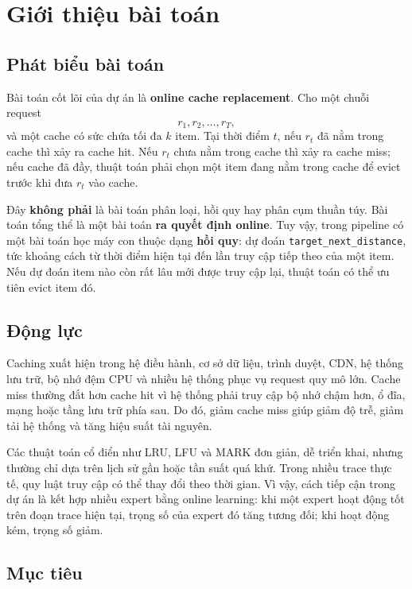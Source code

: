 \documentclass[11pt,a4paper]{article}
\newcommand{\code}[1]{\texttt{#1}}
\begin{document}
\tableofcontents
\newpage

\section{Giới thiệu bài toán}

\subsection{Phát biểu bài toán}

Bài toán cốt lõi của dự án là \textbf{online cache replacement}. Cho một chuỗi request
\[
    r_1, r_2, \ldots, r_T,
\]
và một cache có sức chứa tối đa \(k\) item. Tại thời điểm \(t\), nếu \(r_t\) đã nằm trong cache thì xảy ra cache hit. Nếu \(r_t\) chưa nằm trong cache thì xảy ra cache miss; nếu cache đã đầy, thuật toán phải chọn một item đang nằm trong cache để evict trước khi đưa \(r_t\) vào cache.

Đây \textbf{không phải} là bài toán phân loại, hồi quy hay phân cụm thuần túy. Bài toán tổng thể là một bài toán \textbf{ra quyết định online}. Tuy vậy, trong pipeline có một bài toán học máy con thuộc dạng \textbf{hồi quy}: dự đoán \code{target\_next\_distance}, tức khoảng cách từ thời điểm hiện tại đến lần truy cập tiếp theo của một item. Nếu dự đoán item nào còn rất lâu mới được truy cập lại, thuật toán có thể ưu tiên evict item đó.

\subsection{Động lực}

Caching xuất hiện trong hệ điều hành, cơ sở dữ liệu, trình duyệt, CDN, hệ thống lưu trữ, bộ nhớ đệm CPU và nhiều hệ thống phục vụ request quy mô lớn. Cache miss thường đắt hơn cache hit vì hệ thống phải truy cập bộ nhớ chậm hơn, ổ đĩa, mạng hoặc tầng lưu trữ phía sau. Do đó, giảm cache miss giúp giảm độ trễ, giảm tải hệ thống và tăng hiệu suất tài nguyên.

Các thuật toán cổ điển như LRU, LFU và MARK đơn giản, dễ triển khai, nhưng thường chỉ dựa trên lịch sử gần hoặc tần suất quá khứ. Trong nhiều trace thực tế, quy luật truy cập có thể thay đổi theo thời gian. Vì vậy, cách tiếp cận trong dự án là kết hợp nhiều expert bằng online learning: khi một expert hoạt động tốt trên đoạn trace hiện tại, trọng số của expert đó tăng tương đối; khi hoạt động kém, trọng số giảm.

\subsection{Mục tiêu}
\end{document}
